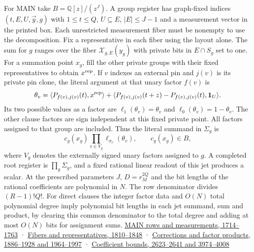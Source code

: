 \documentclass[
  11pt,
]{article}
\begin{document}
For MAIN take \(B=\mathbb Q[z]/(z^J)\). A group register has graph-fixed
indices \((t,E,U,\vec y,g)\) with \(1\le t\le Q\), \(U\subseteq E\),
\(|E|\le J-1\) and a measurement vector in the printed box. Each
unrestricted measurement fiber must be nonempty to use the
decomposition. Fix a representative in each fiber using the layout
alone. The sum for \(g\) ranges over the fiber \(\mathcal X_{g,E}(y_g)\)
with private bits in \(E\cap S_g\) set to one. For a summation point
\(x_g\), fill the other private groups with their fixed representatives
to obtain \(x^{\rm rep}\). If \(v\) indexes an external pin and \(j(v)\)
is its private pin clone, the literal argument at that unary factor
\(f(v)\) is \[
 \theta_v=\langle P_{f(v),j(v)}(t),x^{\rm rep}\rangle+
 \langle P_{f(v),j(v)}(t+z)-P_{f(v),j(v)}(t),\mathbf1_U\rangle .
\] Its two possible values as a factor are \(\ell_1(\theta_v)=\theta_v\)
and \(\ell_0(\theta_v)=1-\theta_v\). The other clause factors are sign
independent at this fixed private point. All factors assigned to that
group are included. Thus the literal summand in \(\Sigma_g\) is \[
 c_g(x_g)\prod_{v\in V_g}\ell_{\sigma_v}(\theta_v),\qquad c_g(x_g)\in B,
\tag{N1}
\] where \(V_g\) denotes the externally signed unary factors assigned to
\(g\). A completed root register is \(\prod_g\Sigma_g\), and a fixed
rational linear readout of this jet produces a scalar. At the prescribed
parameters \(J\), \(D=r_M^{2Q}\) and the bit lengths of the rational
coefficients are polynomial in \(N\). The row denominator divides
\((R-1)!Q!\). For direct clauses the integer factor data and \(O(N)\)
total polynomial degree imply polynomial bit lengths in each jet
summand, sum and product, by clearing this common denominator to the
total degree and adding at most \(O(N)\) bits for assignment sums.
\href{https://github.com/openai/math/blob/main/preprints/The-Exponential-Time-Hypothesis-is-False-October-25-2026/build/main_full_version.tex\#L1714}{MAIN
rows and measurements, 1714--1763} ·
\href{https://github.com/openai/math/blob/main/preprints/The-Exponential-Time-Hypothesis-is-False-October-25-2026/build/main_full_version.tex\#L1810}{Fibers
and representatives, 1810--1848} ·
\href{https://github.com/openai/math/blob/main/preprints/The-Exponential-Time-Hypothesis-is-False-October-25-2026/build/main_full_version.tex\#L1886}{Corrections
and factor products, 1886--1928 and 1964--1997} ·
\href{https://github.com/openai/math/blob/main/preprints/The-Exponential-Time-Hypothesis-is-False-October-25-2026/build/main_full_version.tex\#L2623}{Coefficient
bounds, 2623--2641 and 3974--4008}
\end{document}

